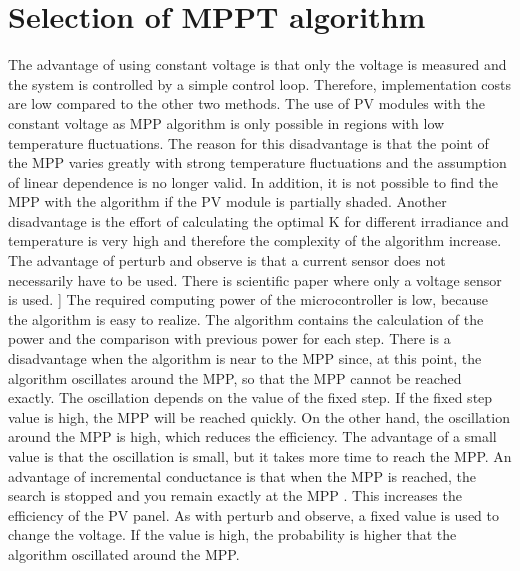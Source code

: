 \section{Selection of MPPT algorithm}\label{MPPTselection}

The advantage of using constant voltage is that only the voltage is measured and the system is controlled by a simple control loop. Therefore, implementation costs are low compared to the other two methods. The use of PV modules with the constant voltage as MPP algorithm is only possible in regions with low temperature fluctuations. The reason for this disadvantage is that the point of the MPP varies greatly with strong temperature fluctuations and the assumption of linear dependence is no longer valid. In addition, it is not possible to find the MPP with the algorithm if the PV module is partially shaded. Another disadvantage is the effort of calculating the optimal K for different irradiance and temperature is very high and therefore the complexity of the algorithm increase. \newline 
The advantage of perturb and observe is that a current sensor does not necessarily have to be used. There is scientific paper where only a voltage sensor is used. ] \cite{}  The required computing power of the microcontroller is low, because the algorithm is easy to realize. The algorithm contains the calculation of the power and the comparison with previous power for each step. There is a disadvantage when the algorithm is near to the MPP since, at this point, the algorithm oscillates around the MPP, so that the MPP cannot be reached exactly. The oscillation depends on the value of the fixed step. If the fixed step value is high, the MPP will be reached quickly. On the other hand, the oscillation around the MPP is high, which reduces the efficiency. The advantage of a small value is that the oscillation is small, but it takes more time to reach the MPP. \newline
An advantage of incremental conductance is that when the MPP is reached, the search is stopped and you remain exactly at the MPP . This increases the efficiency of the PV panel. As with perturb and observe, a fixed value is used to change the voltage. If the value is high, the probability is higher that the algorithm oscillated around the MPP. 
